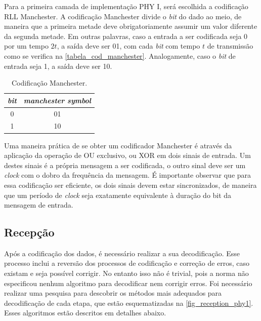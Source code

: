 	Para a primeira camada de implementação PHY I, será escolhida a codificação RLL Manchester. A codificação Manchester divide o \textit{bit} do dado ao meio, de maneira que a primeira metade deve obrigatoriamente assumir um valor diferente da segunda metade. Em outras palavras, caso a entrada a ser codificada seja 0 por um tempo $2t$, a saída deve ser 01, com cada \textit{bit} com tempo $t$ de transmissão como se verifica na \autoref{tabela_cod_manchester}. Analogamente, caso o \textit{bit} de entrada seja 1, a saída deve ser 10.
	\begin{table}[ht]
		\caption{Codificação Manchester.}
		\centering
		\begin{tabular}{c c}
			\hline
			\textit{bit} & \textit{manchester symbol} \\ \hline
			0 & 01 \\
			1 & 10 \\ \hline
		\end{tabular}
		\label{tabela_cod_manchester}
	\end{table}
	Uma maneira prática de se obter um codificador Manchester é através da aplicação da operação de OU exclusivo, ou XOR em dois sinais de entrada. Um destes sinais é a própria mensagem a ser codificada, o outro sinal deve ser um \textit{clock} com o dobro da frequência da mensagem. É importante observar que para essa codificação ser eficiente, os dois sinais devem estar sincronizados, de maneira que um período de \textit{clock} seja exatamente equivalente à duração do bit da mensagem de entrada.

	\subsection{Recepção}\label{section_norma_recepcao}

	Após a codificação dos dados, é necessário realizar a sua decodificação. Esse processo inclui a reversão dos processos de codificação e correção de erros, caso existam e seja possível corrigir. No entanto isso não é trivial, pois a norma não especificou nenhum algoritmo para decodificar nem corrigir erros. Foi necessário realizar uma pesquisa para descobrir os métodos mais adequados para decodificação de cada etapa, que estão esquematizadas na \autoref{fig_reception_phy1}. Esses algoritmos estão descritos em detalhes abaixo.

